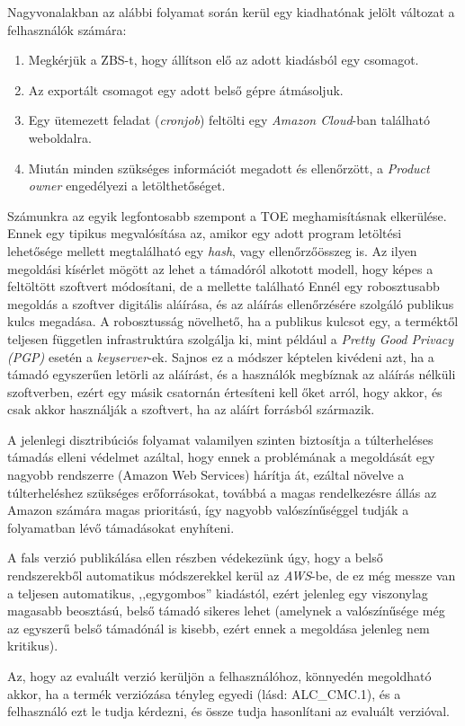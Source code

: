 Nagyvonalakban az alábbi folyamat során kerül egy kiadhatónak jelölt változat a felhasználók
számára:
\begin{enumerate}
    \item Megkérjük a ZBS-t, hogy állítson elő az adott kiadásból egy csomagot.
    \item Az exportált csomagot egy adott belső gépre átmásoljuk.
    \item Egy ütemezett feladat (\emph{cronjob}) feltölti egy \emph{Amazon Cloud}-ban található
        weboldalra.
    \item Miután minden szükséges információt megadott és ellenőrzött, a \emph{Product owner}
        engedélyezi a letölthetőséget.
\end{enumerate}

Számunkra az egyik legfontosabb szempont a TOE meghamisításnak elkerülése. Ennek egy tipikus
megvalósítása az, amikor egy adott program letöltési lehetősége mellett megtalálható egy
\emph{hash}, vagy ellenőrzőösszeg is. Az ilyen megoldási kísérlet mögött az lehet a támadóról
alkotott modell, hogy képes a feltöltött szoftvert módosítani, de a mellette található Ennél egy
robosztusabb megoldás a szoftver digitális aláírása, és az aláírás ellenőrzésére szolgáló publikus
kulcs megadása.  A robosztusság növelhető, ha a publikus kulcsot egy, a terméktől teljesen független
infrastruktúra szolgálja ki, mint például a \emph{Pretty Good Privacy (PGP)} esetén
a \emph{keyserver}-ek.  Sajnos ez a módszer képtelen kivédeni azt, ha a támadó egyszerűen letörli az
aláírást, és a használók megbíznak az aláírás nélküli szoftverben, ezért egy másik csatornán
értesíteni kell őket arról, hogy akkor, és csak akkor használják a szoftvert, ha az aláírt forrásból
származik.

A jelenlegi disztribúciós folyamat valamilyen szinten biztosítja a túlterheléses támadás elleni
védelmet azáltal, hogy ennek a problémának a megoldását egy nagyobb rendszerre (Amazon Web Services)
hárítja át, ezáltal növelve a túlterheléshez szükséges erőforrásokat, továbbá a magas rendelkezésre
állás az Amazon számára magas prioritású, így nagyobb valószínűséggel tudják a folyamatban lévő
támadásokat enyhíteni.

A fals verzió publikálása ellen részben védekezünk úgy, hogy a belső rendszerekből automatikus
módszerekkel kerül az \emph{AWS}-be, de ez még messze van a teljesen automatikus, ,,egygombos''
kiadástól, ezért jelenleg egy viszonylag magasabb beosztású, belső támadó sikeres lehet (amelynek a
valószínűsége még az egyszerű belső támadónál is kisebb, ezért ennek a megoldása jelenleg nem
kritikus).

Az, hogy az evaluált verzió kerüljön a felhasználóhoz, könnyedén megoldható akkor, ha a termék
verziózása tényleg egyedi (lásd: ALC\_CMC.1), és a felhasználó ezt le tudja kérdezni, és össze
tudja hasonlítani az evaluált verzióval.
